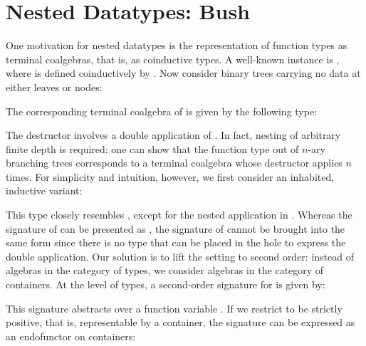 \section{Nested Datatypes: Bush}
\label{sec:bush}

One motivation for nested datatypes is the representation of function types as terminal coalgebras, that is, as coinductive types. A well-known instance is \;\;\;\;\;, where \; is defined coinductively by \;\;\;. Now consider binary trees carrying no data at either leaves or nodes:



The corresponding terminal coalgebra of \;\; is given by the following type:



The destructor  involves a double application of . In fact, nesting of arbitrary finite depth is required: one can show that the function type out of $n$-ary branching trees \;\; corresponds to a terminal coalgebra  whose destructor  applies  $n$ times. For simplicity and intuition, however, we first consider an inhabited, inductive variant:



This type closely resembles , except for the nested application in . Whereas the signature of \; can be presented as \;\;\;\;\;\;, the signature of \; cannot be brought into the same form \;\;\;\;\;\; since there is no type that can be placed in the hole  to express the double application. Our solution is to lift the setting to second order: instead of algebras in the category of types, we consider algebras in the category of containers. At the level of types, a second-order signature for  is given by:



This signature abstracts over a function variable . If we restrict  to be strictly positive, that is, representable by a container, the signature can be expressed as an endofunctor on containers:

